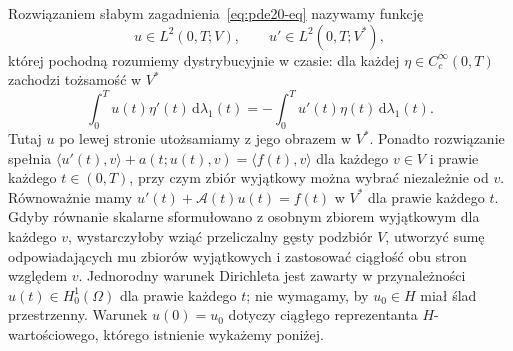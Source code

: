 \begin{definicja}
\label{def:pde20-weak}
Rozwiązaniem słabym zagadnienia~\eqref{eq:pde20-eq} nazywamy funkcję
\[
 u\in L^2(0,T;V),\qquad u'\in L^2(0,T;V^*),
\]
której pochodną rozumiemy dystrybucyjnie w czasie:
dla każdej $\eta\in C_c^\infty(0,T)$ zachodzi tożsamość
w $V^*$
\[
 \int_0^T u(t)\eta'(t)\,\mathrm d\lambda_1(t)
 =-\int_0^T u'(t)\eta(t)\,\mathrm d\lambda_1(t).
\]
Tutaj $u$ po lewej stronie utożsamiamy z jego obrazem
w $V^*$. Ponadto rozwiązanie spełnia
$\langle u'(t),v\rangle+a(t;u(t),v)=\langle f(t),v\rangle$
dla każdego $v\in V$ i prawie każdego $t\in(0,T)$, przy czym zbiór
wyjątkowy można wybrać niezależnie od $v$.
Równoważnie mamy $u'(t)+\mathcal A(t)u(t)=f(t)$
w $V^*$ dla prawie każdego $t$. Gdyby równanie
skalarne sformułowano z osobnym zbiorem wyjątkowym
dla każdego $v$, wystarczyłoby wziąć przeliczalny
gęsty podzbiór $V$, utworzyć sumę odpowiadających mu
zbiorów wyjątkowych
i zastosować ciągłość obu stron względem $v$.
Jednorodny warunek Dirichleta jest zawarty w przynależności
$u(t)\in H_0^1(\Omega)$ dla prawie każdego $t$;
nie wymagamy, by $u_0\in H$ miał ślad przestrzenny.
Warunek $u(0)=u_0$ dotyczy ciągłego reprezentanta $H$-wartościowego,
którego istnienie wykażemy poniżej.
\end{definicja}

